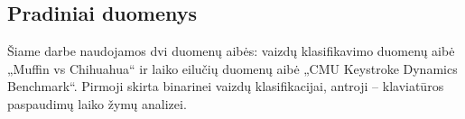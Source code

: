\subsection{Pradiniai duomenys}
\label{subsec:pradiniai_duomenys}

Šiame darbe naudojamos dvi duomenų aibės: vaizdų klasifikavimo duomenų aibė „Muffin vs Chihuahua“ ir laiko eilučių duomenų aibė „CMU Keystroke Dynamics Benchmark“. Pirmoji skirta binarinei vaizdų klasifikacijai, antroji – klaviatūros paspaudimų laiko žymų analizei.


